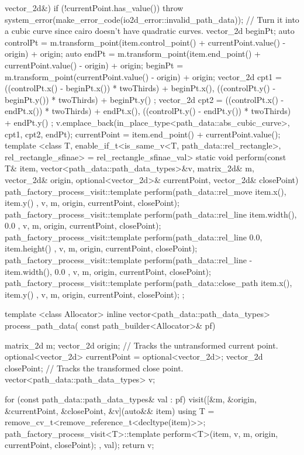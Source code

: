 \begin{codeblock}
{{        vector_2d&) {
        if (!currentPoint.has_value()) {
          throw system_error(make_error_code(io2d_error::invalid_path_data));
        }
        // Turn it into a cubic curve since cairo doesn't have quadratic curves.
        vector_2d beginPt;
        auto controlPt = m.transform_point(item.control_point() + 
          currentPoint.value() - origin) + origin;
        auto endPt = m.transform_point(item.end_point() + currentPoint.value() -
          origin) + origin;
        beginPt = m.transform_point(currentPoint.value() - origin) + origin;
        vector_2d cpt1 = { ((controlPt.x() - beginPt.x()) * twoThirds) + 
          beginPt.x(), ((controlPt.y() - beginPt.y()) * twoThirds) + 
          beginPt.y() };
        vector_2d cpt2 = { ((controlPt.x() - endPt.x()) * twoThirds) + 
          endPt.x(), ((controlPt.y() - endPt.y()) * twoThirds) + endPt.y() };
        v.emplace_back(in_place_type<path_data::abs_cubic_curve>, cpt1, cpt2, 
          endPt);
        currentPoint = item.end_point() + currentPoint.value();
      }
      template <class T, enable_if_t<is_same_v<T, path_data::rel_rectangle>, 
        rel_rectangle_sfinae> = rel_rectangle_sfinae_val>
      static void perform(const T& item, vector<path_data::path_data_types>&v, 
        matrix_2d& m, vector_2d& origin, optional<vector_2d>& currentPoint, 
        vector_2d& closePoint) {
        path_factory_process_visit::template perform(path_data::rel_move{ { 
          item.x(), item.y() } }, v, m, origin, currentPoint, closePoint);
        path_factory_process_visit::template perform(path_data::rel_line{ { 
          item.width(), 0.0 } }, v, m, origin, currentPoint, closePoint);
        path_factory_process_visit::template perform(path_data::rel_line{ { 
          0.0, item.height() } }, v, m, origin, currentPoint, closePoint);
        path_factory_process_visit::template perform(path_data::rel_line{ { 
          -item.width(), 0.0 } }, v, m, origin, currentPoint, closePoint);
        path_factory_process_visit::template perform(path_data::close_path{ { 
          item.x(), item.y() } }, v, m, origin, currentPoint, closePoint);
      }
    };

    template <class Allocator>
    inline vector<path_data::path_data_types> process_path_data(
      const path_builder<Allocator>& pf) {
      matrix_2d m;
      vector_2d origin;
      // Tracks the untransformed current point.
      optional<vector_2d> currentPoint = optional<vector_2d>{};
      vector_2d closePoint;   // Tracks the transformed close point.
      vector<path_data::path_data_types> v;

      for (const path_data::path_data_types& val : pf) {
        visit([&m, &origin, &currentPoint, &closePoint, &v](auto&& item) {
          using T = remove_cv_t<remove_reference_t<decltype(item)>>;
          path_factory_process_visit<T>::template perform<T>(item, v, m, 
            origin, currentPoint, closePoint);
        }, val);
      }
      return v;
    }
}
\end{codeblock}
